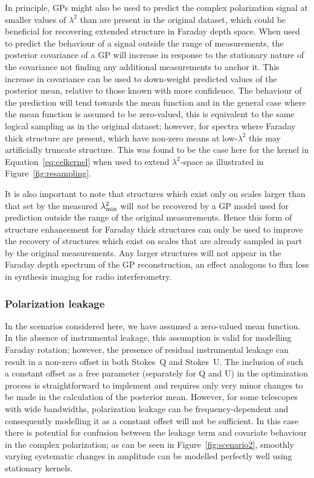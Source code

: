\documentclass[fleqn,usenatbib]{mnras}
\begin{document}
In principle, GPs might also be used to predict the complex polarization signal at smaller values of $\lambda^2$ than are present in the original dataset, which could be beneficial for recovering extended structure in Faraday depth space. When used to predict the behaviour of a signal outside the range of measurements, the posterior covariance of a GP will increase in response to the stationary nature of the covariance not finding any additional measurements to anchor it. This increase in covariance can be used to down-weight predicted values of the posterior mean, relative to those known with more confidence. The behaviour of the prediction will tend towards the mean function and in the general case where the mean function is assumed to be zero-valued, this is equivalent to the same logical sampling as in the original dataset; however, for spectra where Faraday thick structure are present, which have non-zero means at low-$\lambda^2$ this may artificially truncate structure. This was found to be the case here for the kernel in Equation~\ref{eq:celkernel} when used to extend $\lambda^2$-space as illustrated in Figure~\ref{fig:resampling}.

It is also important to note that structures which exist only on scales larger than that set by the measured $\lambda^2_{\rm min}$ will {\it not} be recovered by a GP model used for prediction outside the range of the original measurements. Hence this form of structure enhancement for Faraday thick structures can only be used to improve the recovery of structures which exist on scales that are already sampled in part by the original measurements. Any larger structures will not appear in the Faraday depth spectrum of the GP reconstruction, an effect analogous to flux loss in synthesis imaging for radio interferometry.


\subsubsection{Polarization leakage}
\label{sec:leakage}

In the scenarios considered here, we have assumed a zero-valued mean function. In the absence of instrumental leakage, this assumption is valid for modelling Faraday rotation; however, the presence of residual instrumental leakage can result in a non-zero offset in both Stokes~Q and Stokes~U. The inclusion of such a constant offset as a free parameter (separately for Q and U) in the optimization process is straightforward to implement and requires only very minor changes to be made in the calculation of the posterior mean. However, for some telescopes with wide bandwidths, polarization leakage can be frequency-dependent and consequently modelling it as a constant offset will not be sufficient. In this case there is potential for confusion between the leakage term and covariate behaviour in the complex polarization; as can be seen in Figure~\ref{fig:scenario2}, smoothly varying systematic changes in amplitude can be modelled perfectly well using stationary kernels.
\end{document}

